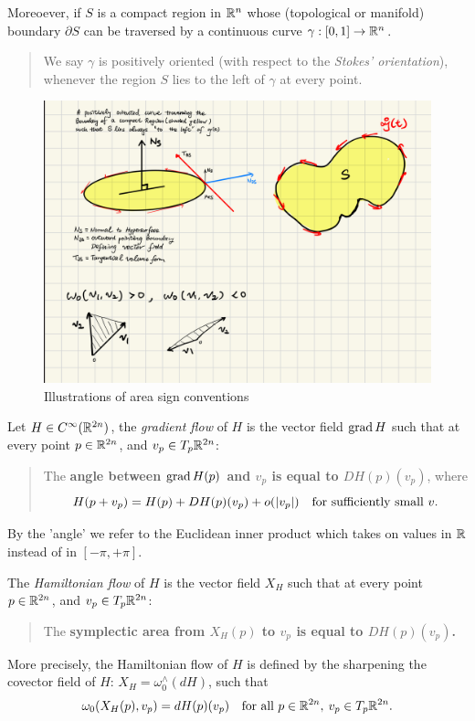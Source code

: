 \documentclass[../main-v2-manifolds.tex]{subfiles}
\begin{document}
Moreoever, if $S$ is a compact region in ${\mathbb{R}^n}$ whose (topological or manifold) boundary $\partial S$ can be traversed by a continuous curve $\gamma:[0,1]\to{\mathbb{R}^n}$. 
\begin{quote}
We say $\gamma$ is positively oriented (with respect to the \emph{Stokes' orientation}), whenever the region $S$ lies to the left of $\gamma$ at every point.
\end{quote}
\begin{figure}[h!]
    \centering
    \includegraphics[width=0.5\linewidth]{images/positive-area-opens-to-left-sketch.png}
    \caption{Illustrations of area sign conventions}
    \label{fig:area sign conventions}
\end{figure}
\begin{remark}\label{rmk:gradient flow}
Let $H\in C^\infty({\mathbb{R}^{2n}})$, the \emph{gradient flow} of $H$ is the vector field $\operatorname{grad} H$ such that at every point $p\in {\mathbb{R}^{2n}}$, and $v_p\in T_p {\mathbb{R}^{2n}}$:
\begin{quote}
    The \textbf{angle between $\operatorname{grad}{H}(p)$ and $v_p$ is equal to $DH(p)(v_p)$}, where
    \begin{equation}
    H(p+v_p) = H(p) + DH(p)(v_p) + o(\vert {v_p} \vert)\quad\text{for sufficiently small }v.
    \label{eq:Frechet Derivative as best possible linear approximation}
\end{equation}
\end{quote}
By the 'angle' we refer to the Euclidean inner product which takes on values in $\mathbb{R}$ instead of in $[-\pi, +\pi]$.
\end{remark}
\begin{definition}
    The \emph{Hamiltonian flow} of $H$ is the vector field $X_H$ such that at every point $p\in {\mathbb{R}^{2n}}$, and $v_p\in T_p{\mathbb{R}^{2n}}$:
    \begin{quote}
        The \textbf{symplectic area from $X_H(p)$ to $v_p$ is equal to $DH(p)(v_p)$.}
    \end{quote}
    More precisely, the Hamiltonian flow of $H$ is defined by the sharpening the covector field of $H$:  $X_H = \omega_0^{\wedge}(dH)$, such that
    \begin{equation}
        \omega_0(X_H(p), v_p) = dH(p)(v_p)\quad\text{for all }p\in {\mathbb{R}^{2n}},\: v_p\in T_p{\mathbb{R}^{2n}}.
        \label{eq:hamiltonian flow definition symplectic pairing}
    \end{equation}
\end{definition}
\end{document}
